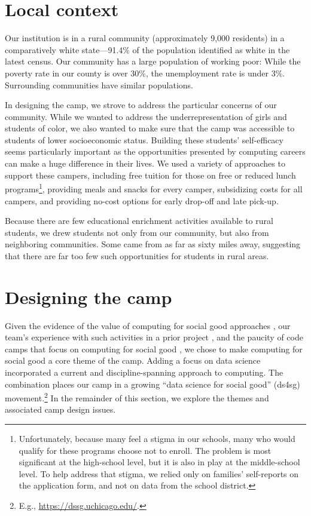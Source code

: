 \section{Local context}

Our institution is in a rural community (approximately 9,000
residents) in a comparatively white state---91.4\% of the population identified as white
in the latest census.  Our community has a large population of
working poor: While the poverty rate in our county is over 30\%,
the unemployment rate is under 3\%.  Surrounding communities have
similar populations.

In designing the camp, we strove to address the particular concerns
of our community.  While we wanted to address the underrepresentation
of girls and students of color, we also wanted to make sure that
the camp was accessible to students of lower socioeconomic status.
Building these students' self-efficacy seems particularly important
as the opportunities presented by computing careers can make a huge
difference in their lives.  We used a variety of approaches to
support these campers, including free tuition for those on free
or reduced lunch programs\footnote{Unfortunately, because many feel
a stigma in our schools, many who would qualify for these
programs choose not to enroll.  The problem is most significant at
the high-school level, but it is also in play at the
middle-school level.  To help address that stigma, we relied only
on families' self-reports on the application form, and not on data
from the school district.}, providing meals and snacks for every
camper, subsidizing costs for all campers, and providing no-cost
options for early drop-off and late pick-up.

Because there are few educational enrichment activities available
to rural students, we drew students not only from our community,
but also from neighboring communities.  Some came from as far as
sixty miles away, suggesting that there are far too few such
opportunities for students in rural areas.

\section{Designing the camp}

Given the evidence of the value of computing for social good
approaches \cite{Goldweber2013,Goldweber2018}, our team's experience
with such activities in a prior project \cite{arts-coding}, and the
paucity of code camps that focus on computing for social
good \cite{DeWitt2017}, we chose to make
computing for social good a core theme of the camp.  
Adding a focus on data science incorporated a current and
discipline-spanning approach to computing.
The combination places our camp in a growing
``data science for social good'' (ds4sg) movement.\footnote{E.g.,
\url{https://dssg.uchicago.edu/}.}  
In the remainder of this section, we explore the themes and
associated camp design issues.

